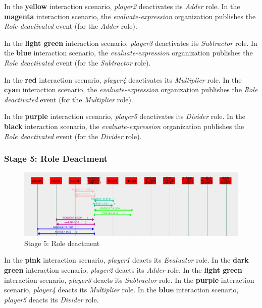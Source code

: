 In the \textbf{yellow} interaction scenario, \textit{player2} deactivates its \textit{Adder} role.
In the \textbf{magenta} interaction scenario, the \textit{evaluate-expression} organization publishes the \textit{Role deactivated} event (for the \textit{Adder} role).

In the \textbf{light green} interaction scenario, \textit{player3} deactivates its \textit{Subtractor} role.
In the \textbf{blue} interaction scenario, the \textit{evaluate-expression} organization publishes the \textit{Role deactivated} event (for the \textit{Subtractor} role).

In the \textbf{red} interaction scenario, \textit{player4} deactivates its \textit{Multiplier} role.
In the \textbf{cyan} interaction scenario, the \textit{evaluate-expression} organization publishes the \textit{Role deactivated} event (for the \textit{Multiplier} role).

In the \textbf{purple} interaction scenario, \textit{player5} deactivates its \textit{Divider} role.
In the \textbf{black} interaction scenario, the \textit{evaluate-expression} organization publishes the \textit{Role deactivated} event (for the \textit{Divider} role).

\subsubsection*{Stage 5: Role Deactment}

\begin{figure}[H]
	\centering
	\includegraphics[width=\textwidth]{images/example2-stage5.png}
	\caption{Stage 5: Role deactment}
	\label{figure:example2-stage5}
\end{figure} 

In the \textbf{pink} interaction scenario, \textit{player1} deacts its \textit{Evaluator} role.
In the \textbf{dark green} interaction scenario, \textit{player2} deacts its \textit{Adder} role.
In the \textbf{light green} interaction scenario, \textit{player3} deacts its \textit{Subtractor} role.
In the \textbf{purple} interaction scenario, \textit{player4} deacts its \textit{Multiplier} role.
In the \textbf{blue} interaction scenario, \textit{player5} deacts its \textit{Divider} role.